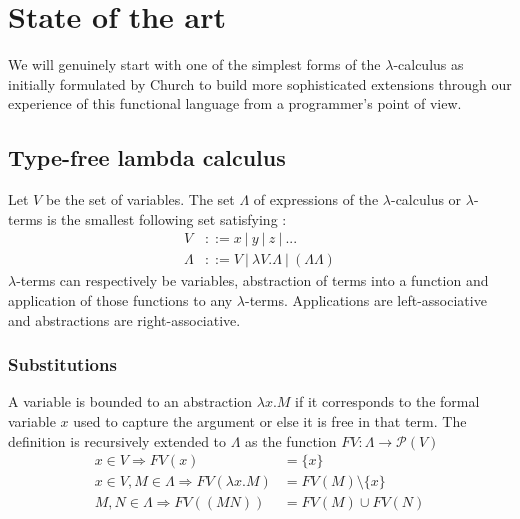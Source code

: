 \documentclass{article}
\begin{document}
\section{State of the art}
We will genuinely start with one of the simplest forms of the $\lambda$-calculus as initially formulated by Church to build more sophisticated extensions through our experience of this functional language from a programmer's point of view.
\subsection{Type-free lambda calculus}
    Let $V$ be the set of variables. The set $\Lambda$ of expressions of the $\lambda$-calculus or $\lambda$-terms is the smallest following set  satisfying :
    \begin{align}
        V &::= x \ | \ y \ | \ z \ | \ ... \\
        \Lambda &::= V \ | \ \lambda V.\Lambda \ | \ (\Lambda \Lambda)
    \end{align}
    $\lambda$-terms can respectively be variables, abstraction of terms into a function and application of those functions to any $\lambda$-terms. Applications are left-associative and abstractions are right-associative.

    \subsubsection{Substitutions}\label{Free variables}
    A variable is bounded to an abstraction $\lambda x.M$ if it corresponds to the formal variable $x$ used to capture the argument or else it is free in that term. The definition is recursively extended to $\Lambda$ as the function $FV : \Lambda\rightarrow \mathscr{P}(V)$
    \begin{align}
        x\in V \Rightarrow FV(x) &= \{x\}\\
        x\in V, M\in\Lambda \Rightarrow FV(\lambda x.M) &= FV(M) \setminus \{x\} \\
        M,N\in\Lambda \Rightarrow FV((M N)) &= FV(M)\cup FV(N)
    \end{align}
\end{document}
